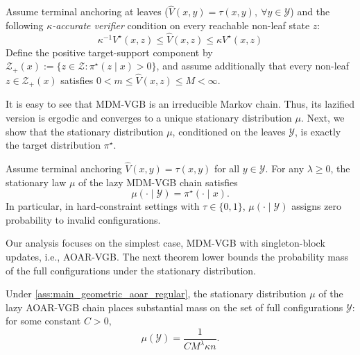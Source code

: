 \documentclass{article}
\numberwithin{theorem}{section}
\numberwithin{proposition}{section}
\numberwithin{corollary}{section}
\numberwithin{lemma}{section}
\numberwithin{conjecture}{section}
\numberwithin{remark}{section}
\numberwithin{definition}{section}
\numberwithin{assumption}{section}
\numberwithin{example}{section}
\newcommand{\calY}{{\mathcal{Y}}}
\newcommand{\calZ}{{\mathcal{Z}}}
\begin{document}
\vspace{-6pt}
\begin{assumption}
\label{ass:main_geometric_aoar_regular}
Assume terminal anchoring at leaves ($\widehat{V}(x,y) =\tau(x,y), \ \forall y\in \calY$) and 
the following
\emph{$\kappa$-accurate verifier} condition on every reachable non-leaf state
$z$:
\begin{equation*}
    \kappa^{-1}V^\star(x,z)
    \le
    \widehat V(x,z)
    \le
    \kappa V^\star(x,z)
\end{equation*}
Define the positive target-support component by \(\calZ_+(x):=\{z\in\calZ: \pi^\star(z\mid x)>0\}\), and assume additionally that every non-leaf $z\in\calZ_+(x)$ satisfies $0<m\le \widehat V(x,z)\le M<\infty$.
\end{assumption}
It is easy to see that MDM-VGB is an irreducible Markov chain. Thus, its lazified version\footnotemark{}
is ergodic and converges to a unique stationary distribution $\mu.$
Next, we show that the stationary distribution $\mu$, conditioned on the leaves $\calY$, is exactly the target distribution $\pi^\star.$

\begin{theorem}
\label{thm:main_exact_leaf_law}
Assume
terminal anchoring
\(\widehat V(x,y)=\tau(x,y)\) for all \(y\in\calY\). For any
\(\lambda\ge0\), the stationary law \(\mu\) of the lazy MDM-VGB chain satisfies
\[
    \mu(\cdot\mid\calY)=\pi^\star(\cdot\mid x).
\]
In particular, in hard-constraint settings with \(\tau\in\{0,1\}\), $\mu(\cdot\mid\calY)$ assigns zero probability to invalid configurations.
\end{theorem}
Our analysis focuses on the simplest case, MDM-VGB with singleton-block updates, i.e., AOAR-VGB. The next theorem lower bounds the probability mass of the full configurations under the stationary distribution.

\begin{theorem}\label{thm:leaf mass probability}
    Under \cref{ass:main_geometric_aoar_regular}, the stationary distribution $\mu$ of the lazy AOAR-VGB chain places substantial mass on the set of full configurations $\calY$: for some constant $C>0,$
\[
    \mu(\calY)
    =
   \frac{1}{ C M^\lambda\kappa n}.
\]
\end{theorem}
\end{document}
